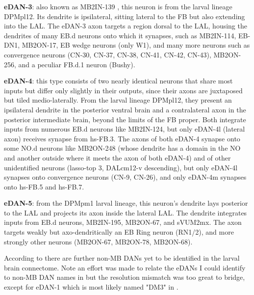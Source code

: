 \textbf{eDAN-3}: also known as MB2IN-139 \citep{eschbach2021circuits}, this neuron is from the larval lineage DPMpl12. Its dendrite is ipsilateral, sitting lateral to the FB but also extending into the LAL. The eDAN-3 axon targets a region dorsal to the LAL, housing the dendrites of  many EB.d neurons onto which it synapses, such as MB2IN-114, EB-DN1, MB2ON-17, EB wedge neurons (only W1), and many more neurons such as convergence neurons (CN-30, CN-37, CN-38, CN-41, CN-42, CN-43), MB2ON-256, and a peculiar FB.d.1 neuron (Bushy).

\textbf{eDAN-4}: this type consists of two nearly identical neurons that share most inputs but differ only slightly in their outputs, since their axons are juxtaposed but tiled medio-laterally. From the larval lineage DPMpl12, they present an ipsilateral dendrite in the posterior ventral brain and a contralateral axon in the posterior intermediate brain, beyond the limits of the FB proper. Both integrate inputs from numerous EB.d neurons like MB2IN-124, but only eDAN-4l (lateral axon) receives synapse from hs-FB.3. The axons of both eDAN-4 synapse onto some NO.d neurons like MB2ON-248 (whose dendrite has a domain in the NO and another outside where it meets the axon of both eDAN-4) and of other unidentified neurons (lasso-top 3, DALcm12-v descending), but only eDAN-4l synapses onto convergence neurons (CN-9, CN-26), and only eDAN-4m synapses onto hs-FB.5 and hs-FB.7.

\textbf{eDAN-5}: from the DPMpm1 larval lineage, this neuron's dendrite lays posterior to the LAL and projects its axon inside the lateral LAL. The dendrite integrates inputs from EB.d neurons, MB2IN-195, MB2ON-67, and sVUM2mx. The axon targets weakly but axo-dendritically an EB Ring neuron (RN1/2), and more strongly other neurons (MB2ON-67, MB2ON-78, MB2ON-68).

According to \citep{selcho2009thgal4} there are further non-MB DANs yet to be identified in the larval brain connectome. Note an effort was made to relate the eDANs I could identify to non-MB DAN names in \citep{selcho2009thgal4} but the resolution mismatch was too great to bridge, except for eDAN-1 which is most likely named "DM3" in \citep{selcho2009thgal4}.


